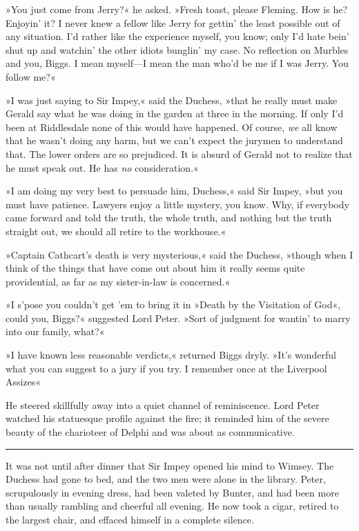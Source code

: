 »You just come from Jerry?« he asked. »Fresh toast, please Fleming. How is he? Enjoyin' it? I never knew a fellow like Jerry for gettin' the least possible out of any situation. I'd rather like the experience myself, you know; only I'd hate bein' shut up and watchin' the other idiots bunglin' my case. No reflection on Murbles and you, Biggs. I mean myself\allowbreak---\allowbreak I mean the man who'd be me if I was Jerry. You follow me?«

»I was just saying to Sir Impey,« said the Duchess, »that he really must make Gerald say what he was doing in the garden at three in the morning. If only I'd been at Riddlesdale none of this would have happened. Of course, \textit{we} all know that he wasn't doing any harm, but we can't expect the jurymen to understand that. The lower orders are so prejudiced. It is absurd of Gerald not to realize that he must speak out. He has \textit{no} consideration.«

»I am doing my very best to persuade him, Duchess,« said Sir Impey, »but you must have patience. Lawyers enjoy a little mystery, you know.  Why, if everybody came forward and told the truth, the whole truth, and nothing but the truth straight out, we should all retire to the workhouse.«

»Captain Cathcart's death is very mysterious,« said the Duchess, »though when I think of the things that have come out about him it really seems quite providential, as far as my sister-in-law is concerned.«

»I s'pose you couldn't get 'em to bring it in »Death by the Visitation of God«, could you, Biggs?« suggested Lord Peter. »Sort of judgment for wantin' to marry into our family, what?«

»I have known less reasonable verdicts,« returned Biggs dryly. »It's wonderful what you can suggest to a jury if you try. I remember once at the Liverpool Assizes\longdash«

He steered skillfully away into a quiet channel of reminiscence. Lord Peter watched his statuesque profile against the fire; it reminded him of the severe beauty of the charioteer of Delphi and was about as communicative.

\noindent\hfil\rule{0.5\textwidth}{.4pt}\hfil

It was not until after dinner that Sir Impey opened his mind to Wimsey.  The Duchess had gone to bed, and the two men were alone in the library.  Peter, scrupulously in evening dress, had been valeted by Bunter, and had been more than usually rambling and cheerful all evening. He now took a cigar, retired to the largest chair, and effaced himself in a complete silence.

